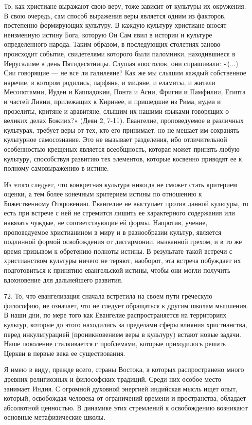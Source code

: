 \documentclass[a5paper,10pt]{article}
\begin{document}
То, как христиане выражают свою веру, тоже зависит от культуры их окружения. В
свою очередь, сам способ выражения веры является одним из факторов, постепенно
формирующих культуру. В каждую культуру христиане вносят неизменную истину
Бога, которую Он Сам явил в истории и культуре определенного народа. Таким
образом, в последующих столетиях заново происходит событие, свидетелями
которого были паломники, находившиеся в Иерусалиме в день Пятидесятницы. Слушая
апостолов, они спрашивали: «(...) Сии говорящие — не все ли галилеяне? Как же
мы слышим каждый собственное наречие, в котором родились, парфяне, и мидяне, и
еламиты, и жители Месопотамии, Иудеи и Каппадокии, Понта и Асии, Фригии и
Памфилии, Египта и частей Ливии, прилежащих к Киринее, и пришедшие из Рима,
иудеи и прозелиты, критяне и аравитяне, слышим их нашими языками говорящих о
великих делах Божиих?» (Деян 2, 7-11). Евангелие, проповедуемое в различных
культурах, требует веры от тех, кто его принимает, но не мешает им сохранять
культурное самосознание. Это не вызывает разделения, ибо отличительной
особенностью крещеных является всеобщность, которая может принять любую
культуру, способствуя развитию тех элементов, которые косвенно приводят ее к
полному самовыражению в истине.

Из этого следует, что конкретная культура никогда не сможет стать критерием
оценки, а тем более конечным критерием истины по отношению к Божественному
Откровению. Евангелие не выступает против данной культуры, то есть при встрече
с ней не стремится лишить ее характерного содержания или навязать чуждые, не
соответствующие ей формы. Напротив, учение, проповедуемое христианином в миру и
в разнообразии культур, является подлинной формой освобождения от дисгармонии,
вызванной грехом, и в то же время призывом к обретению полноты истины. В
результате такой встречи с христианством культуры ничего не теряют, наоборот,
эта встреча побуждает их подготовиться к принятию евангельской истины, чтобы
они могли получить вдохновение для дальнейшего развития.

72. То, что евангелизация сначала встретила на своем пути греческую философию,
не означает, что не следует обращаться к другим школам мышления. В наши дни, по
мере того как Евангелие распространяется на территориях культур, которые до
этого находились за пределами сферы влияния христианства, перед инкультурацией
(проникновением веры в культуру) встают новые задачи. Наше поколение
сталкивается с проблемами, которые приходилось решать Церкви в первые века ее
существования.

Я имею в виду, прежде всего, страны Востока, в которых распространено много
древних религиозных и философских традиций. Среди них особое место занимает
Индия. С огромной духовной энергией индийская мысль ищет опыт, который,
освобождая человека от ограничений времени и пространства, обладает абсолютной
ценностью. В динамике этих стремлений к освобождению возникают основные
метафизические школы.
\end{document}

